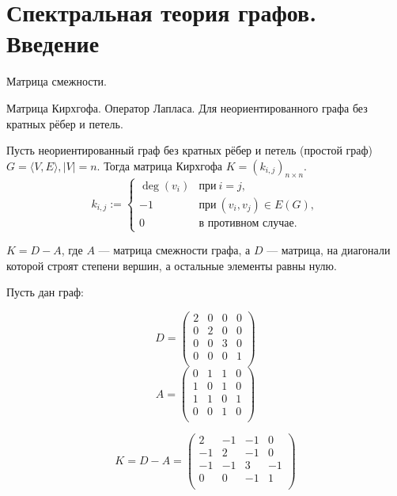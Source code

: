 \section{Спектральная теория графов. Введение}

Матрица смежности.

Матрица Кирхгофа. Оператор Лапласа. Для неориентированного графа без кратных рёбер и петель.
\begin{definition}
Пусть неориентированный граф без кратных рёбер и петель (простой граф) $G=\langle V, E \rangle, |V| = n$. Тогда матрица Кирхгофа $ K=(k_{i,j})_{n \times n}$. 
$$ k_{i,j}:={\begin{cases}\deg(v_{i})&{\text{при}}\ i=j,\\-1&{\text{при}}\ (v_{i},v_{j})\in E(G),\\0&{\text{в противном случае}}.\end{cases}}
$$
\end{definition}

$K = D - A$, где $A$ --- матрица смежности графа, а $D$ --- матрица, на диагонали которой строят степени вершин, а остальные элементы равны нулю.


\begin{example}
Пусть дан граф:
  \begin{center}
  \end{center}
  $$ D =
  \left({
  \begin{array}{rrrrrr}
  2 & 0 & 0 & 0 \\
  0 & 2 & 0 & 0 \\
  0 & 0 & 3 & 0 \\
  0 & 0 & 0 & 1 \\
  \end{array}
  }\right)
$$
$$ A =
  \left({
  \begin{array}{rrrrrr}
  0 & 1 & 1 & 0 \\
  1 & 0 & 1 & 0 \\
  1 & 1 & 0 & 1 \\
  0 & 0 & 1 & 0 \\
  \end{array}
  }\right)
$$

$$ K = D - A =
  \left({
  \begin{array}{rrrrrr}
  2  & -1 & -1 & 0  \\
  -1 & 2  & -1 & 0  \\
  -1 & -1 & 3  & -1 \\
  0  & 0  & -1 & 1  \\
  \end{array}
  }\right)
$$
\end{example}

